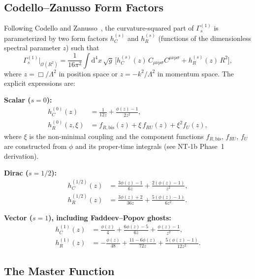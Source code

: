 \documentclass[11pt,a4paper]{article}
\newcommand{\Weylsq}{C_{\mu\nu\rho\sigma}C^{\mu\nu\rho\sigma}}
\renewcommand{\dd}{\mathrm{d}}
\theoremstyle{plain}
\theoremstyle{definition}
\begin{document}
\subsection{Codello--Zanusso Form Factors}\label{ssec:CZ}

Following Codello and Zanusso~\cite{CZ12}, the curvature-squared
part of $\Gamma^{(1)}_s$ is parameterized by two form factors
$h_C^{(s)}$ and $h_R^{(s)}$ (functions of the dimensionless spectral
parameter $z$) such that
\begin{equation}\label{eq:Gamma-CZ}
  \Gamma^{(1)}_s\Big|_{\mathcal{O}(R^2)} =
  \frac{1}{16\pi^2} \int \dd^4 x\, \sqrt{g}\,
  \Big[ h_C^{(s)}(z)\, \Weylsq + h_R^{(s)}(z)\, R^2 \Big],
\end{equation}
where $z = \Box/\Lambda^2$ in position space or $z = -k^2/\Lambda^2$
in momentum space. The explicit expressions are:

\medskip
\noindent\textbf{Scalar ($s = 0$):}
\begin{align}
  h_C^{(0)}(z) &= \frac{1}{12z} + \frac{\phi(z)-1}{2z^2},
  \label{eq:hC0}\\
  h_R^{(0)}(z,\xi) &= f_{R,\mathrm{bis}}(z)
    + \xi\, f_{RU}(z) + \xi^2 f_U(z),
  \label{eq:hR0}
\end{align}
where $\xi$ is the non-minimal coupling and the component functions
$f_{R,\mathrm{bis}}$, $f_{RU}$, $f_U$ are constructed from $\phi$
and its proper-time integrals (see NT-1b Phase~1 derivation).

\medskip
\noindent\textbf{Dirac ($s = 1/2$):}
\begin{align}
  h_C^{(1/2)}(z) &= \frac{3\phi(z)-1}{6z}
    + \frac{2(\phi(z)-1)}{z^2},
  \label{eq:hC12}\\
  h_R^{(1/2)}(z) &= \frac{3\phi(z)+2}{36z}
    + \frac{5(\phi(z)-1)}{6z^2}.
  \label{eq:hR12}
\end{align}

\medskip
\noindent\textbf{Vector ($s = 1$), including Faddeev--Popov ghosts:}
\begin{align}
  h_C^{(1)}(z) &= \frac{\phi(z)}{4}
    + \frac{6\phi(z)-5}{6z} + \frac{\phi(z)-1}{z^2},
  \label{eq:hC1}\\
  h_R^{(1)}(z) &= -\frac{\phi(z)}{48}
    + \frac{11 - 6\phi(z)}{72z}
    + \frac{5(\phi(z)-1)}{12z^2}.
  \label{eq:hR1}
\end{align}

\subsection{The Master Function}\label{ssec:master}
\end{document}
